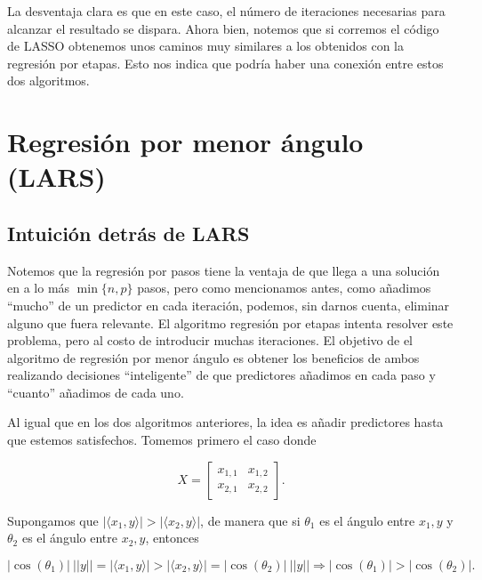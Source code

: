 \documentclass[
  letterpaper,
  DIV=11,
  numbers=noendperiod]{scrreprt}
\theoremstyle{plain}
\theoremstyle{definition}
\theoremstyle{remark}
\begin{document}
La desventaja clara es que en este caso, el número de iteraciones
necesarias para alcanzar el resultado se dispara. Ahora bien, notemos
que si corremos el código de LASSO obtenemos unos caminos muy similares
a los obtenidos con la regresión por etapas. Esto nos indica que podría
haber una conexión entre estos dos algoritmos.


\chapter{Regresión por menor ángulo
(LARS)}\label{regresiuxf3n-por-menor-uxe1ngulo-lars}

\section{Intuición detrás de LARS}\label{intuiciuxf3n-detruxe1s-de-lars}

Notemos que la regresión por pasos tiene la ventaja de que llega a una
solución en a lo más \(\min\{n,p\}\) pasos, pero como mencionamos antes,
como añadimos ``mucho'' de un predictor en cada iteración, podemos, sin
darnos cuenta, eliminar alguno que fuera relevante. El algoritmo
regresión por etapas intenta resolver este problema, pero al costo de
introducir muchas iteraciones. El objetivo de el algoritmo de regresión
por menor ángulo es obtener los beneficios de ambos realizando
decisiones ``inteligente'' de que predictores añadimos en cada paso y
``cuanto'' añadimos de cada uno.

Al igual que en los dos algoritmos anteriores, la idea es añadir
predictores hasta que estemos satisfechos. Tomemos primero el caso donde

\[
X=\begin{bmatrix}
x_{1,1}&x_{1,2}\\
x_{2,1}&x_{2,2}
\end{bmatrix}.
\]

Supongamos que \(|\langle x_1,y\rangle|>|\langle x_2,y\rangle|\), de
manera que si \(\theta_1\) es el ángulo entre \(x_1, y\) y \(\theta_2\)
es el ángulo entre \(x_2,y\), entonces

\[
|\cos(\theta_1)|~||y||=|\langle x_1,y\rangle|>|\langle x_2,y\rangle|=|\cos(\theta_2)|~||y||\Rightarrow |\cos(\theta_1)|>|\cos(\theta_2)|.
\]
\end{document}
